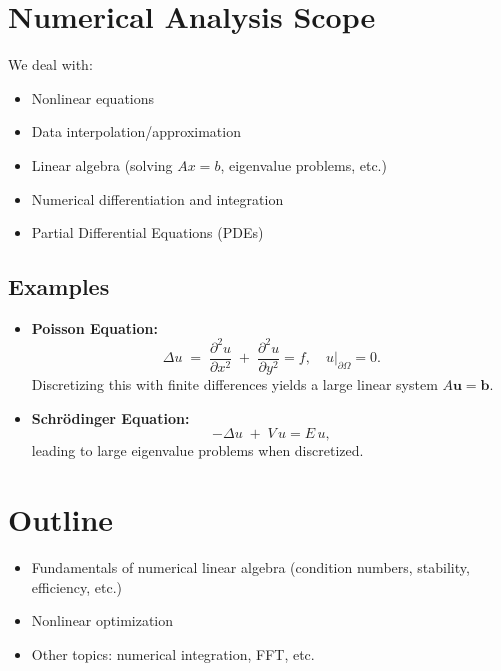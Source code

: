 \section*{Numerical Analysis Scope}

We deal with:
\begin{itemize}
    \item Nonlinear equations
    \item Data interpolation/approximation
    \item Linear algebra (solving $A x = b$, eigenvalue problems, etc.)
    \item Numerical differentiation and integration
    \item Partial Differential Equations (PDEs)
\end{itemize}

\subsection*{Examples}
\begin{itemize}
    \item \textbf{Poisson Equation:}
    \[
      \Delta u \;=\; \frac{\partial^2 u}{\partial x^2} 
      \;+\; \frac{\partial^2 u}{\partial y^2} 
      = f,\quad u\big|_{\partial \Omega} = 0.
    \]
    Discretizing this with finite differences yields a large linear system $A\mathbf{u} = \mathbf{b}$.
    \item \textbf{Schr\"odinger Equation:}
    \[
      -\Delta u \;+\; V\,u = E\,u,
    \]
    leading to large eigenvalue problems when discretized.
\end{itemize}

\section*{Outline}
\begin{itemize}
    \item Fundamentals of numerical linear algebra (condition numbers, stability, efficiency, etc.)
    \item Nonlinear optimization
    \item Other topics: numerical integration, FFT, etc.
\end{itemize}

